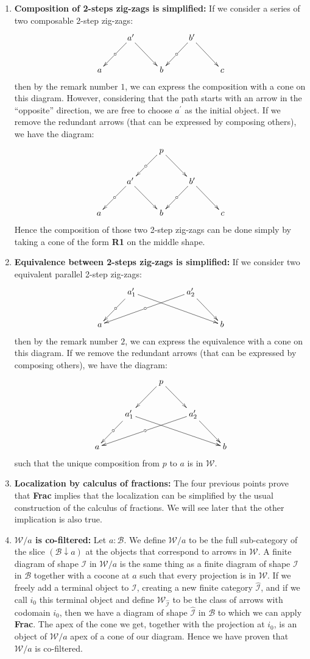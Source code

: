 \documentclass{article}
\numberwithin{equation}{section}
\theoremstyle{definition}
\theoremstyle{plain}
\begin{document}
\begin{enumerate}
\[{		&& \bullet \ar[r] & \cdots \ar[r] & \bullet \ar@{<-}[ur]|{\circ}\\
	}\]
	This gives a simpler general form for the equivalences between paths.
	\item \textbf{Composition of 2-steps zig-zags is simplified:} If we consider a series of two composable 2-step zig-zags:
	\[\xymatrix{
		& a^{\prime} \ar[dl]|{\circ} \ar[dr] && b^{\prime} \ar[dl]|{\circ} \ar[dr]\\
		a && b && c
	}\]
	then by the remark number $1$, we can express the composition with a cone on this diagram. However, considering that the path starts with an arrow in the ``opposite'' direction, we are free to choose $a^{\prime}$ as the initial object. If we remove the redundant arrows (that can be expressed by composing others), we have the diagram:
	\[\xymatrix{
		&& p \ar[dl]|{\circ} \ar[dr]\\
		& a^{\prime} \ar[dl]|{\circ} \ar[dr] && b^{\prime} \ar[dl]|{\circ} \ar[dr]\\
		a && b && c
	}\]
	Hence the composition of those two 2-step zig-zags can be done simply by taking a cone of the form \textbf{R1} on the middle shape.
	\item \textbf{Equivalence between 2-steps zig-zags is simplified:} If we consider two equivalent parallel 2-step zig-zags:
	\[\xymatrix{
		& a^{\prime}_1 \ar[dl]|{\circ} \ar[drrr] && a^{\prime}_2 \ar[dlll]|{\circ} \ar[dr]\\
		a &&&& b
	}\]
	then by the remark number $2$, we can express the equivalence with a cone on this diagram. If we remove the redundant arrows (that can be expressed by composing others), we have the diagram:
	\[\xymatrix{
		&& p \ar[dl] \ar[dr]\\
		& a^{\prime}_1 \ar[dl]|{\circ} \ar[drrr] && a^{\prime}_2 \ar[dlll]|{\circ} \ar[dr]\\
		a &&&& b
	}\]
	such that the unique composition from $p$ to $a$ is in $\mathcal{W}$.
	\item \textbf{Localization by calculus of fractions:} The four previous points prove that \textbf{Frac} implies that the localization can be simplified by the usual construction of the calculus of fractions. We will see later that the other implication is also true.
	\item \textbf{$\mathcal{W}/a$ is co-filtered:} Let $a: \mathcal{B}$. We define $\mathcal{W}/a$ to be the full sub-category of the slice $(\mathcal{B} \downarrow a)$ at the objects that correspond to arrows in $\mathcal{W}$. A finite diagram of shape $\mathcal{I}$ in $\mathcal{W}/a$ is the same thing as a finite diagram of shape $\mathcal{I}$ in $\mathcal{B}$ together with a cocone at $a$ such that every projection is in $\mathcal{W}$. If we freely add a terminal object to $\mathcal{I}$, creating a new finite category $\widehat{\mathcal{I}}$, and if we call $i_0$ this terminal object and define $\mathcal{W}_{\widehat{\mathcal{I}}}$ to be the class of arrows with codomain $i_0$, then we have a diagram of shape $\widehat{\mathcal{I}}$ in $\mathcal{B}$ to which we can apply \textbf{Frac}. The apex of the cone we get, together with the projection at $i_0$, is an object of $\mathcal{W}/a$ apex of a cone of our diagram. Hence we have proven that $\mathcal{W}/a$ is co-filtered.

\end{enumerate}
\end{document}
